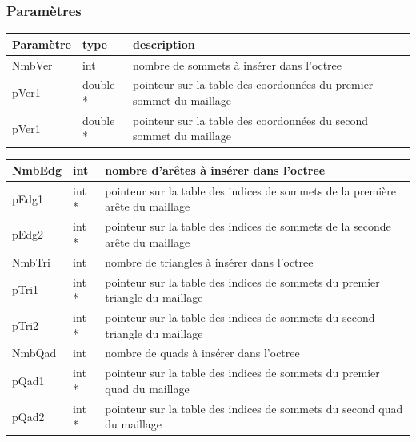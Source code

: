\documentclass[a4paper,12pt]{article}
\begin{document}
\subsubsection*{Paramètres}

\begin{tabular}{|m{2cm}|m{2cm}|m{10cm}|}
\hline
Paramètre  & type     & description \\
\hline
NmbVer     & int      & nombre de sommets à insérer dans l'octree \\
\hline
pVer1      & double * & pointeur sur la table des coordonnées du premier sommet du maillage \\
\hline
pVer1      & double * & pointeur sur la table des coordonnées du second sommet du maillage \\
\hline
\end{tabular}

\begin{tabular}{|m{2cm}|m{2cm}|m{10cm}|}
\hline
NmbEdg     & int      & nombre d'arêtes à insérer dans l'octree  \\
\hline
pEdg1      & int *    & pointeur sur la table des indices de sommets de la première arête du maillage \\
\hline
pEdg2      & int *    & pointeur sur la table des indices de sommets de la seconde arête du maillage \\
\hline
NmbTri     & int      & nombre de triangles à insérer dans l'octree  \\
\hline
pTri1      & int *    & pointeur sur la table des indices de sommets du premier triangle du maillage \\
\hline
pTri2      & int *    & pointeur sur la table des indices de sommets du second triangle du maillage \\
\hline
NmbQad     & int      & nombre de quads à insérer dans l'octree  \\
\hline
pQad1      & int *    & pointeur sur la table des indices de sommets du premier quad du maillage \\
\hline
pQad2      & int *    & pointeur sur la table des indices de sommets du second quad du maillage \\
\hline
\end{tabular}
\end{document}
